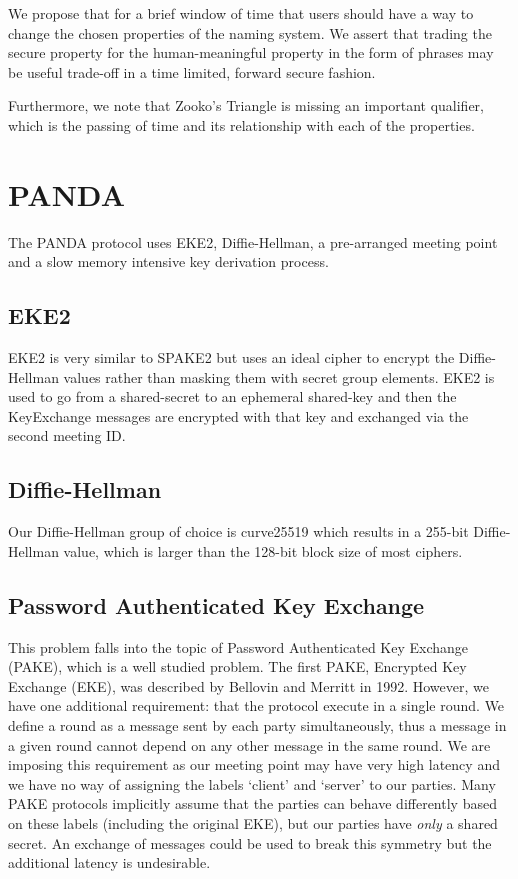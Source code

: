 \documentclass[letterpaper,twocolumn,10pt]{article}
\begin{document}
We propose that for a brief window of time that users should have a way to
change the chosen properties of the naming system.  We assert that trading the
secure property for the human-meaningful property in the form of phrases may be
useful trade-off in a time limited, forward secure fashion.

Furthermore, we note that Zooko's Triangle is missing an important qualifier,
which is the passing of time and its relationship with each of the properties.

\section{PANDA}

The PANDA protocol uses EKE2, Diffie-Hellman, a pre-arranged meeting point and
a slow memory intensive key derivation process.

\subsection{EKE2}

EKE2 is very similar to SPAKE2 but uses an ideal cipher to encrypt the
Diffie-Hellman values rather than masking them with secret group elements. EKE2
is used to go from a shared-secret to an ephemeral shared-key and then the
KeyExchange messages are encrypted with that key and exchanged via the second
meeting ID.

\subsection{Diffie-Hellman}

Our Diffie-Hellman group of choice is curve25519\cite{bernstein2006curve25519}
which results in a 255-bit Diffie-Hellman value, which is larger than the
128-bit block size of most ciphers.

\subsection{Password Authenticated Key Exchange}

This problem falls into the topic of Password Authenticated Key Exchange
(PAKE), which is a well studied problem. The first PAKE, Encrypted Key Exchange
(EKE), was described by Bellovin and Merritt\cite{bellovin1992encrypted} in
1992. However, we have one additional requirement: that the protocol execute in
a single round. We define a round as a message sent by each party
simultaneously, thus a message in a given round cannot depend on any other
message in the same round.  We are imposing this requirement as our meeting
point may have very high latency and we have no way of assigning the labels
`client' and `server' to our parties.  Many PAKE protocols implicitly assume
that the parties can behave differently based on these labels (including the
original EKE), but our parties have {\it only} a shared secret. An exchange of
messages could be used to break this symmetry but the additional latency is
undesirable.
\end{document}
